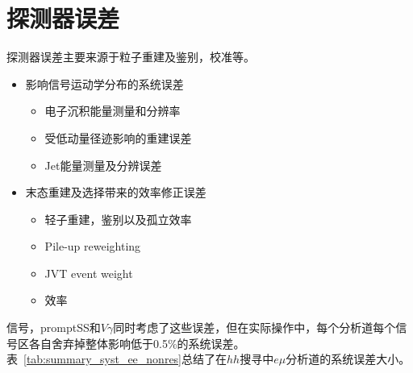 \section{探测器误差}
探测器误差主要来源于粒子重建及鉴别，校准等。
\begin{itemize}
  \item 影响信号运动学分布的系统误差
   \begin{itemize}
     \item 电子沉积能量测量和分辨率
     \item 受低动量径迹影响的\met 重建误差
     \item Jet能量测量及分辨误差
   \end{itemize}
   \item 末态重建及选择带来的效率修正误差
    \begin{itemize}
      \item 轻子重建，鉴别以及孤立效率
      \item Pile-up reweighting
      \item JVT event weight
      \item \btag 效率
    \end{itemize}
\end{itemize}
信号，promptSS和$V\gamma$同时考虑了这些误差，但在实际操作中，每个分析道每个信号区各自舍弃掉整体影响低于0.5\%的系统误差。表~\ref{tab:summary_syst_ee_nonres}总结了在$hh$搜寻中$e\mu$分析道的系统误差大小。
